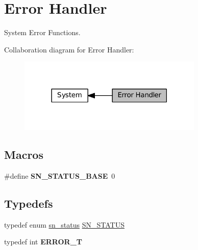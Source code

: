 \hypertarget{group__SYSTEM__ERROR}{}\section{Error Handler}
\label{group__SYSTEM__ERROR}


System Error Functions.  


Collaboration diagram for Error Handler\+:\nopagebreak
\begin{figure}[H]
\begin{center}
\leavevmode
\includegraphics[width=249pt]{group__SYSTEM__ERROR}
\end{center}
\end{figure}
\subsection*{Macros}
\begin{DoxyCompactItemize}
\item 
\mbox{\label{group__SYSTEM__ERROR_gae11b1d812e86d15ff7eef402ab14a522}} 
\#define {\bfseries S\+N\+\_\+\+S\+T\+A\+T\+U\+S\+\_\+\+B\+A\+SE}~0
\end{DoxyCompactItemize}
\subsection*{Typedefs}
\begin{DoxyCompactItemize}
\item 
typedef enum \hyperlink{group__SYSTEM__ERROR_ga8cb157fafd64d5b57cdc905615978e99}{sn\+\_\+status} \hyperlink{group__SYSTEM__ERROR_ga4540713b9a7a18ce44d78c3a10f7442f}{S\+N\+\_\+\+S\+T\+A\+T\+US}
\item 
\mbox{\label{group__SYSTEM__ERROR_ga8052e9054a9f729dd6df474e52738add}} 
typedef int {\bfseries E\+R\+R\+O\+R\+\_\+T}
\end{DoxyCompactItemize}
